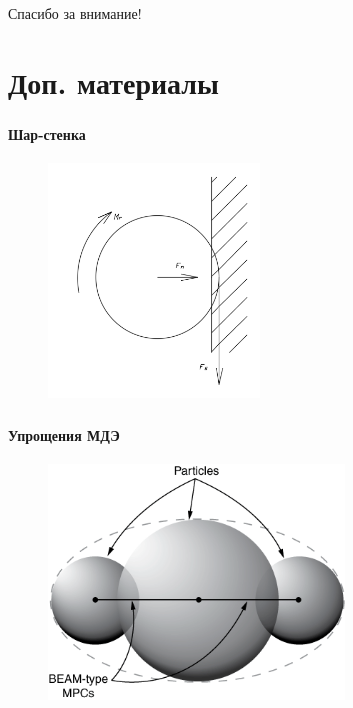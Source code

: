 \documentclass[c]{beamer}  %
\begin{document}
\begin{frame}
\centering
Спасибо за внимание!
\end{frame}

\section{Доп. материалы}

\begin{frame}
\frametitle{\insertsection} 
\framesubtitle{Шар-стенка}

\begin{figure}[h!]
	\centering
	\includegraphics[width=0.5\textwidth]{ball_wall}
\end{figure} 
\end{frame}


\begin{frame}
\frametitle{\insertsection} 
\framesubtitle{Упрощения МДЭ}

\begin{figure}[h!]
	\centering
	\includegraphics[width=0.7\textwidth]{dem-rigid-cluster}
\end{figure} 
\end{frame}




 
\end{document}

